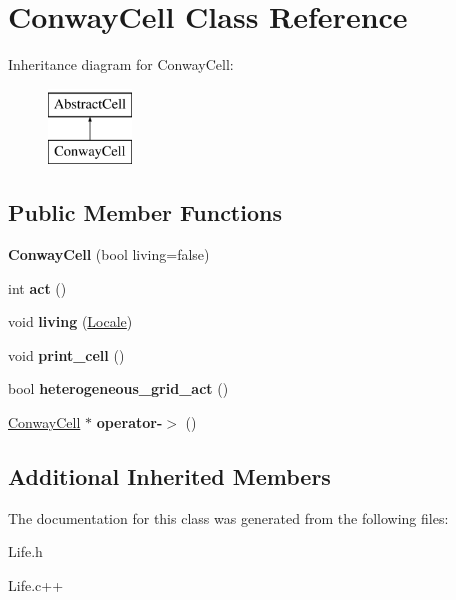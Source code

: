 \hypertarget{classConwayCell}{\section{Conway\-Cell Class Reference}
\label{classConwayCell}
}
Inheritance diagram for Conway\-Cell\-:\begin{figure}[H]
\begin{center}
\leavevmode
\includegraphics[height=2.000000cm]{classConwayCell}
\end{center}
\end{figure}
\subsection*{Public Member Functions}
\begin{DoxyCompactItemize}
\item 
\hypertarget{classConwayCell_a29d644f02614791cc1599bcb452ff640}{{\bfseries Conway\-Cell} (bool living=false)}\label{classConwayCell_a29d644f02614791cc1599bcb452ff640}

\item 
\hypertarget{classConwayCell_a1805b09ec0ce84f68e986d592185309f}{int {\bfseries act} ()}\label{classConwayCell_a1805b09ec0ce84f68e986d592185309f}

\item 
\hypertarget{classConwayCell_a031aefa5a4a75cc0fc64ee4b8907d2f0}{void {\bfseries living} (\hyperlink{structLocale}{Locale})}\label{classConwayCell_a031aefa5a4a75cc0fc64ee4b8907d2f0}

\item 
\hypertarget{classConwayCell_aa93e8d9d3a1c6ec2eeb7586c3e082a89}{void {\bfseries print\-\_\-cell} ()}\label{classConwayCell_aa93e8d9d3a1c6ec2eeb7586c3e082a89}

\item 
\hypertarget{classConwayCell_aca833d0cfa7e1d361700302ec3e81f5d}{bool {\bfseries heterogeneous\-\_\-grid\-\_\-act} ()}\label{classConwayCell_aca833d0cfa7e1d361700302ec3e81f5d}

\item 
\hypertarget{classConwayCell_a6c7be773417cf17223228fa676765e17}{\hyperlink{classConwayCell}{Conway\-Cell} $\ast$ {\bfseries operator-\/$>$} ()}\label{classConwayCell_a6c7be773417cf17223228fa676765e17}

\end{DoxyCompactItemize}
\subsection*{Additional Inherited Members}


The documentation for this class was generated from the following files\-:\begin{DoxyCompactItemize}
\item 
Life.\-h\item 
Life.\-c++\end{DoxyCompactItemize}
